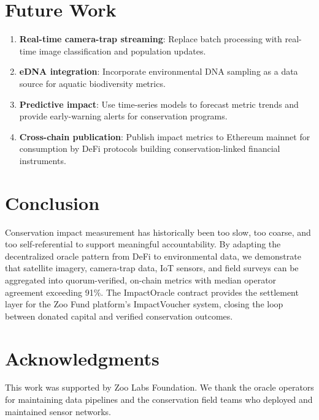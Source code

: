 \documentclass[11pt,letterpaper]{article}
\begin{document}
\section{Future Work}

\begin{enumerate}
    \item \textbf{Real-time camera-trap streaming}: Replace batch processing with real-time image classification and population updates.
    \item \textbf{eDNA integration}: Incorporate environmental DNA sampling as a data source for aquatic biodiversity metrics.
    \item \textbf{Predictive impact}: Use time-series models to forecast metric trends and provide early-warning alerts for conservation programs.
    \item \textbf{Cross-chain publication}: Publish impact metrics to Ethereum mainnet for consumption by DeFi protocols building conservation-linked financial instruments.
\end{enumerate}

\section{Conclusion}

Conservation impact measurement has historically been too slow, too coarse, and too self-referential to support meaningful accountability. By adapting the decentralized oracle pattern from DeFi to environmental data, we demonstrate that satellite imagery, camera-trap data, IoT sensors, and field surveys can be aggregated into quorum-verified, on-chain metrics with median operator agreement exceeding 91\%. The ImpactOracle contract provides the settlement layer for the Zoo Fund platform's ImpactVoucher system, closing the loop between donated capital and verified conservation outcomes.

\section*{Acknowledgments}

This work was supported by Zoo Labs Foundation. We thank the oracle operators for maintaining data pipelines and the conservation field teams who deployed and maintained sensor networks.
\end{document}
